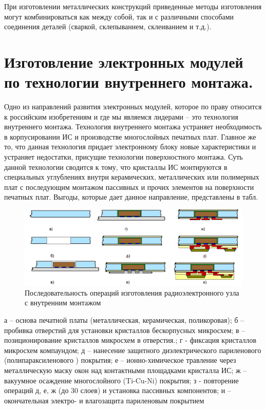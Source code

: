\documentclass[unicode, 12pt, a4paper, oneside]{article}
\begin{document}
При изготовлении металлических конструкций приведенные методы изготовления могут комбинироваться как между собой, так и с различными способами соединения деталей (сваркой, склепыванием, склеиванием и т.д.).


\section{Изготовление электронных модулей по технологии внутреннего монтажа.}

Одно из направлений развития электронных модулей, которое по праву относится к российским изобретениям и где мы являемся лидерами – это технология внутреннего монтажа. Технология внутреннего монтажа устраняет необходимость в корпусировании ИС и производстве многослойных печатных плат. Главное же то, что данная технология придает электронному блоку новые характеристики и устраняет недостатки, присущие технологии поверхностного монтажа. Суть данной технологии сводится к тому, что кристаллы ИС монтируются в специальных углублениях внутри керамических, металлических или полимерных плат с последующим монтажом пассивных и прочих элементов на поверхности печатных плат. Выгоды, которые дает данное направление, представлены в табл.

\begin{figure}[htbp]
\centering
\includegraphics[width=1.0\textwidth]{100_types.png}
\caption{Последовательность операций изготовления радиоэлектронного узла  с внутренним монтажом}
\label{fig:100_types}
\end{figure}

а – основа печатной платы (металлическая, керамическая, поликоровая); б – пробивка отверстий для установки кристаллов бескорпусных микросхем; в – позиционирование кристаллов микросхем в отверстия.; г -  фиксация кристаллов микросхем компаундом; д – нанесение защитного диэлектрического париленового (полипараксиленового ) покрытия; е – ионно-химическое травление через металлическую маску окон над контактными площадками кристалла ИС; ж – вакуумное осаждение многослойного  (Ti-Cu-Ni) покрытия; з -  повторение операций д, е, ж (до 30 слоев) и установка пассивных компонентов; и – окончательная электро- и влагозащита париленовым покрытием
\end{document}
